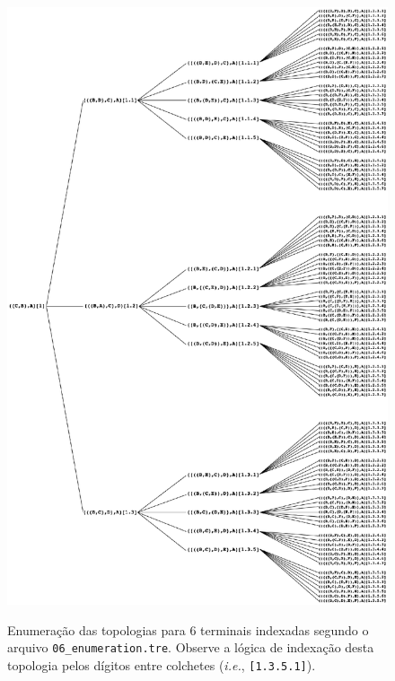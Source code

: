 \begin{refsection}
  \begin{figure}[H]
      {\includegraphics[scale=0.80]{figures/tut3/enumeration_A4.eps}}
      {\caption[Enumeração indexada]{Enumeração das topologias para 6 terminais indexadas segundo o arquivo \texttt{06\_enumeration.tre}. Observe a lógica de indexação desta topologia pelos dígitos entre colchetes (\textit{i.e.}, \texttt{[1.3.5.1]}).}\label{tut3:fig:enumeration_indexed}}
  \end{figure}



\end{refsection}
